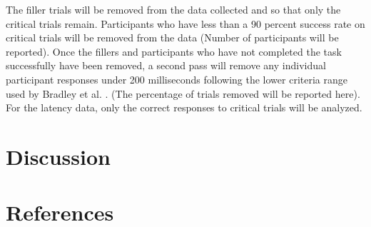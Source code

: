 The filler trials will be removed from the data collected and so that only the critical trials remain. Participants who have less than a 90 percent success rate on critical trials will be removed from the data (Number of participants will be reported). Once the fillers and participants who have not completed the task successfully have been removed, a second pass will remove any individual participant responses under 200 milliseconds following the lower criteria range used by Bradley et al. \parencite*{Bradley1993-qq}. (The percentage of trials removed will be reported here). For the latency data, only the correct responses to critical trials will be analyzed.




\section{Discussion}




\section{References}






